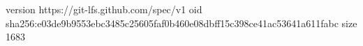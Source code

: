 version https://git-lfs.github.com/spec/v1
oid sha256:e03de9b9553ebc3485c25605faf0b460e08dbff15c398ce41ac53641a611fabc
size 1683

